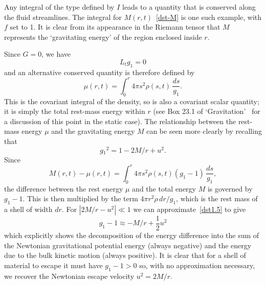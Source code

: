 \documentclass[a4paper]{article}
\numberwithin{equation}{section}
\newcommand{\half}{{\textstyle \frac{1}{2}}}
\begin{document}
Any integral of the type defined by $I$ leads to a quantity that is
conserved along the fluid streamlines.  The integral for
$M(r,t)$~\eqref{dst-M} is one such example, with $f$ set to 1.  It is
clear from its appearance in the Riemann tensor that $M$ represents
the `gravitating energy' of the region enclosed inside $r$.  

Since $G=0$, we have
%
\begin{equation}
L_t g_1 = 0
\end{equation}
%
and an alternative conserved quantity is therefore defined by
%
\begin{equation}
\mu(r,t) = \int_0^r 4 \pi s^2 \rho(s,t) \, \frac{ds}{g_1}.
\label{cos-restm}
\end{equation}
%
This is the covariant integral of the density, so is also a covariant
scalar quantity; it is simply the total rest-mass energy within $r$
(see Box 23.1 of `Gravitation'~\cite{mis-grav} for a discussion of
this point in the static case).  The relationship between the
rest-mass energy $\mu$ and the gravitating energy $M$ can be seen more
clearly by recalling that
%
\begin{equation}
g{_1}^2 = 1 - 2M/r + u^2.
\label{dst1.5}
\end{equation}
%
Since
%
\begin{equation}
M(r,t) - \mu(r,t) =  \int_0^r 4 \pi s^2 \rho(s,t) (g_1 - 1)\,
\frac{ds}{g_1} ,
\end{equation}	
%
the difference between the rest energy $\mu$ and the total energy $M$
is governed by $g_1-1$.  This is then multiplied by the term $4\pi
r^2\rho\, dr /g_1$, which is the rest mass of a shell of width $dr$.
For $|2M/r-u^2| \ll 1$ we can approximate~\eqref{dst1.5} to give
%
\begin{equation}
g_1 -1 \approx - M/r + \half u^2
\end{equation}
%
which explicitly shows the decomposition of the energy difference into
the sum of the Newtonian gravitational potential energy (always
negative) and the energy due to the bulk kinetic motion (always
positive).  It is clear that for a shell of material to escape it must
have $g_1-1 > 0$ so, with no approximation necessary, we recover the
Newtonian escape velocity $u^2 = 2M/r$.
\end{document}
